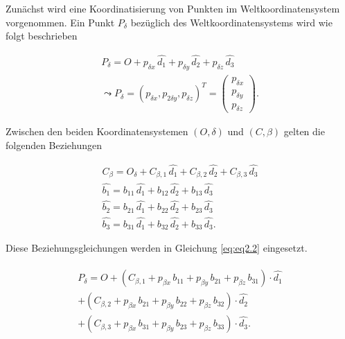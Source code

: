 
Zunächst wird eine Koordinatisierung von Punkten im Weltkoordinatensystem vorgenommen. Ein Punkt $P_\delta$ bezüglich des Weltkoordinatensystems wird wie folgt beschrieben


\begin{gather}
	P_\delta = O + p_{\delta x}\,\hat{d_1} + p_{\delta y}\,\hat{d_2} + p_{\delta z}\,\hat{d_3}\label{eq:eq2.2}\\
	\leadsto P_\delta = (p_{\delta x},p_{2\delta y},p_{\delta z})^T = \begin{pmatrix} p_{\delta x} \\ p_{\delta y} \\ p_{\delta z} \end{pmatrix}.
\end{gather}

Zwischen den beiden Koordinatensystemen	$(O,\delta)$  und $(C,\beta)$ gelten die folgenden Beziehungen

\begin{gather}
	C_\beta = O_\delta + C_{\beta,1}\,\hat{d_1} +C_{\beta,2}\,\hat{d_2} + C_{\beta,3}\,\hat{d_3}\\
	\hat{b_1} = b_{11}\,\hat{d_1} +  b_{12}\,\hat{d_2} +  b_{13}\,\hat{d_3}\\
	\hat{b_2} = b_{21}\,\hat{d_1} +  b_{22}\,\hat{d_2} +  b_{23}\,\hat{d_3}\\
	\hat{b_3} = b_{31}\,\hat{d_1} +  b_{32}\,\hat{d_2} +  b_{33}\,\hat{d_3}.
\end{gather}

Diese Beziehungsgleichungen werden in Gleichung \ref{eq:eq2.2} eingesetzt.

\begin{gather}
	\begin{split}
		P_\delta = O + (C_{\beta,1} + p_{\beta x}\,b_{11} +  p_{\beta y}\,b_{21} + p_{\beta z}\,b_{31}) \cdot \hat{d_1}\\
		+(C_{\beta,2} + p_{\beta x}\,b_{21} +  p_{\beta y}\,b_{22} + p_{\beta z}\,b_{32} )\cdot \hat{d_2}\\
		+ (C_{\beta,3} + p_{\beta x}\,b_{31} +  p_{\beta y}\,b_{23} + p_{\beta z}\,b_{33} )\cdot \hat{d_3}.\label{eq:2.8}
	\end{split}
\end{gather}

